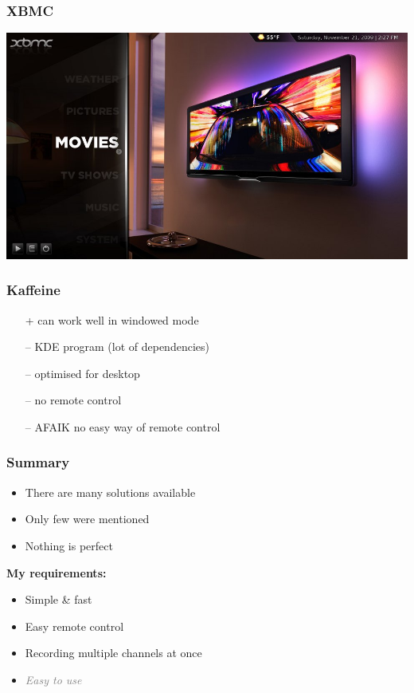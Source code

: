 \documentclass{beamer}
\begin{document}
\begin{frame}[t]
	\frametitle{XBMC}
	\begin{center}
	\includegraphics[width=.8\paperwidth]{xbmc}
	\end{center}
\end{frame}

\begin{frame}[t]
	\frametitle{Kaffeine}
	\begin{itemize}
		\item[+] can work well in windowed mode
		\item[--] KDE program (lot of dependencies)
		\item[--] optimised for desktop
		\item[--] no remote control
		\item[--] AFAIK no easy way of remote control
	\end{itemize}
	\vfill
\end{frame}


\begin{frame}[t]
	\frametitle{Summary}
	\begin{itemize}
		\item There are many solutions available
		\item Only few were mentioned
		\item Nothing is perfect
	\end{itemize}

	\vspace{0.5cm}
	\textbf{My requirements:}
	\begin{itemize}
		\item Simple \& fast
		\item Easy remote control
		\item Recording multiple channels at once
		\item \textcolor{gray}{\textit{Easy to use}}
	\end{itemize}
\end{frame}
\end{document}
